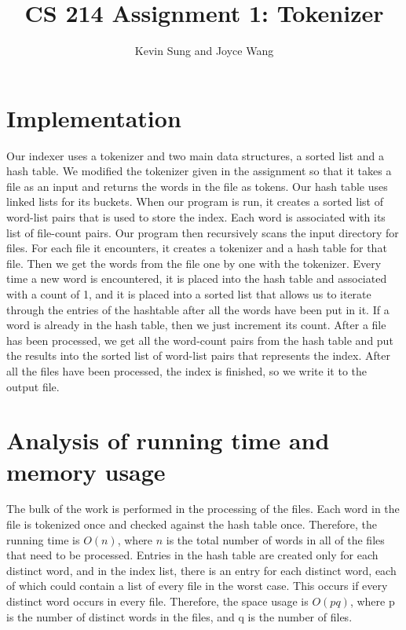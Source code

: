 \documentclass{article}
\title{CS 214 Assignment 1: Tokenizer}
\author{Kevin Sung and Joyce Wang}
\begin{document}
\maketitle

\section{Implementation}

Our indexer uses a tokenizer and two main data structures, a sorted list and a hash table. We modified the tokenizer
given in the assignment so that it takes a file as an input and returns the words in the file as tokens. Our hash
table uses linked lists for its buckets.
When our program is run, it creates a sorted list of word-list pairs that is used to store the index. Each word is
associated with its list of file-count pairs. Our program then recursively scans the input directory for files.
For each file it encounters, it creates
a tokenizer and a hash table for that file. Then we get the words from the file one by one with the tokenizer. Every
time a new word is encountered, it is placed into the hash table and associated with a count of 1, and it is placed
into a sorted list that allows us to iterate through the entries of the hashtable after all the words have been put
in it. If a word is already in the hash table, then we just increment its count. After a file has been processed, we
get all the word-count pairs from the hash table and put the results into the sorted list of word-list pairs that
represents the index. After all the files have been processed, the index is finished, so we write it to the output
file.

\section{Analysis of running time and memory usage}

The bulk of the work is performed in the processing of the files. Each word in the file is tokenized once and checked
against the hash table once. Therefore, the running time is $O(n)$, where $n$ is the total number of words in all
of the files that need to be processed. Entries in the hash table are created only for each distinct word, and
in the index list, there is an entry for each distinct word, each of which could contain a list of every file in
the worst case. This occurs if every distinct word occurs in every file. Therefore, the space usage is $O(pq)$,
where p is the number of distinct words in the files, and q is the number of files.
\end{document}
